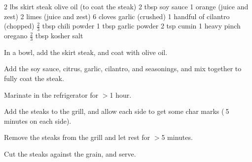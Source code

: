 \dishtype{\main}
\begin{ingreds}
    2 lbs skirt steak
    olive oil (to coat the steak)
    2 tbsp soy sauce
    1 orange (juice and zest)
    2 limes (juice and zest)
    6 cloves garlic (crushed)
    1 handful of cilantro (chopped)
    $\frac{2}{3}$ tbsp chili powder
    1 tbsp garlic powder
    2 tsp cumin
    1 heavy pinch oregano
    $\frac{2}{3}$ tbsp kosher salt
\end{ingreds}
\begin{method}
    In a bowl, add the skirt steak, and coat with olive oil.\par
    Add the soy sauce, citrus, garlic, cilantro, and seasonings, and mix together to fully coat the steak.\par
    Marinate in the refrigerator for $>$1 hour.\par
    Add the steaks to the grill, and allow each side to get some char marks ($~$5 minutes on each side).\par
    Remove the steaks from the grill and let rest for $>$5 minutes.\par
    Cut the steaks against the grain, and serve. 
\end{method}